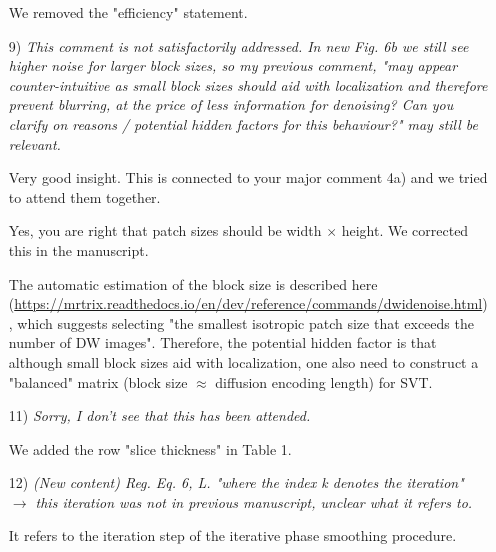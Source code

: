 \documentclass[a4paper,11pt,twoside]{report}
\begin{document}
\begin{enumerate}
    \hspace{1em} {\color{blue} We removed the "efficiency" statement.}

    \item [9)] \textit{This comment is not satisfactorily addressed. In new Fig. 6b we still see higher noise for larger block sizes, so my previous comment, "may appear counter-intuitive as small block sizes should aid with localization and therefore prevent blurring, at the price of less information for denoising? Can you clarify on reasons / potential hidden factors for this behaviour?" may still be relevant.}

    \hspace{1em} {\color{blue} Very good insight.
    This is connected to your major comment 4a)
    and we tried to attend them together.

    \hspace{1em} Yes, you are right that
    patch sizes should be width $\times$ height.
    We corrected this in the manuscript.

    \hspace{1em} The automatic estimation of the block size
    is described here (\url{https://mrtrix.readthedocs.io/en/dev/reference/commands/dwidenoise.html}),
    which suggests selecting "the smallest isotropic patch size
    that exceeds the number of DW images".
    Therefore, the potential hidden factor is that
    although small block sizes aid with localization,
    one also need to construct a "balanced" matrix
    (block size $\approx$ diffusion encoding length) for SVT.
    }

    \item [11)] \textit{Sorry, I don't see that this has been attended.}

    \hspace{1em} {\color{blue} We added the row "slice thickness" in Table 1.}

    \item [12)] \textit{(New content) Reg. Eq. 6, L. "where the index k denotes the iteration" $\rightarrow$ this iteration was not in previous manuscript, unclear what it refers to.}

    \hspace{1em} {\color{blue} It refers to the iteration step
    of the iterative phase smoothing procedure.}

\end{enumerate}
\end{document}
